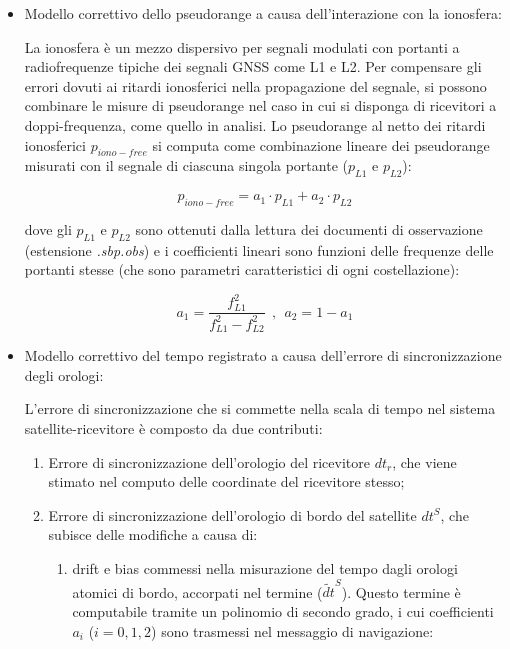 \documentclass[a4paper,11pt,twoside]{book}
\begin{document}
	\begin{itemize}[-]
		
		\item Modello correttivo dello pseudorange a causa dell'interazione con la ionosfera:
		
		La ionosfera è un mezzo dispersivo per segnali modulati con portanti a radiofrequenze tipiche dei segnali GNSS come L1 e L2. Per compensare gli errori dovuti ai ritardi ionosferici nella propagazione del segnale, si possono combinare le misure di pseudorange nel caso in cui si disponga di ricevitori a doppi-frequenza, come quello in analisi. Lo pseudorange al netto dei ritardi ionosferici $p_{iono-free}$ si computa come combinazione lineare dei pseudorange misurati con il segnale di ciascuna singola portante ($p_{L1}$ e $p_{L2}$):
		
		\begin{equation}
			p_{iono-free} = a_1 \cdot p_{L1} + a_2 \cdot p_{L2} 
		\end{equation}
		
		dove gli $p_{L1}$ e $p_{L2}$ sono ottenuti dalla lettura dei documenti di osservazione (estensione \textsl{.sbp.obs}) e i coefficienti lineari sono funzioni delle frequenze delle portanti stesse (che sono parametri caratteristici di ogni costellazione):
		
		\begin{equation}
			a_1 = \frac{f^2_{L1}}{f^2_{L1} - f^2_{L2}} \ \ , \ \ a_2 = 1 - a_1 
		\end{equation}
		
		\item Modello correttivo del tempo registrato a causa dell'errore di sincronizzazione degli orologi:
		
		L'errore di sincronizzazione che si commette nella scala di tempo nel sistema satellite-ricevitore è composto da due contributi:
		
		\begin{enumerate}
			\item Errore di sincronizzazione dell'orologio del ricevitore $dt_r$, che viene stimato nel computo delle coordinate del ricevitore stesso;
			
			\item Errore di sincronizzazione dell'orologio di bordo del satellite $dt^S$, che subisce delle modifiche a causa di:
			
			\begin{enumerate}
				\item drift e bias commessi nella misurazione del tempo dagli orologi atomici di bordo, accorpati nel termine ($\tilde{dt}^S$). Questo termine è computabile tramite un polinomio di secondo grado, i cui coefficienti $a_i$ ($i=0,1,2$) sono trasmessi nel messaggio di navigazione:
				

\end{enumerate}
\end{enumerate}
\end{itemize}
\end{document}
